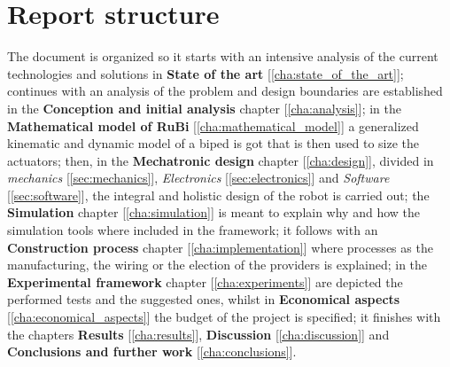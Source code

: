 \section{Report structure}
\label{sec:report_structure}
The document is organized so it starts with an intensive analysis of the current technologies and solutions in \textbf{State of the art} [\ref{cha:state_of_the_art}]; continues with an analysis of the problem and design boundaries are established in the \textbf{Conception and initial analysis} chapter [\ref{cha:analysis}]; in the \textbf{Mathematical model of RuBi} [\ref{cha:mathematical_model}] a generalized kinematic and dynamic model of a biped is got that is then used to size the actuators; then, in  the \textbf{Mechatronic design} chapter [\ref{cha:design}], divided in \textit{mechanics} [\ref{sec:mechanics}], \textit{Electronics} [\ref{sec:electronics}] and \textit{Software} [\ref{sec:software}], the integral and holistic design of the robot is carried out; the \textbf{Simulation} chapter [\ref{cha:simulation}] is meant to explain why and how the simulation tools where included in the framework; it follows with an \textbf{Construction process} chapter [\ref{cha:implementation}] where processes as the manufacturing, the wiring or the election of the providers is explained; in the \textbf{Experimental framework} chapter [\ref{cha:experiments}] are depicted the performed tests and the suggested ones, whilst in \textbf{Economical aspects} [\ref{cha:economical_aspects}] the budget of the project is specified; it finishes with the chapters \textbf{Results} [\ref{cha:results}], \textbf{Discussion} [\ref{cha:discussion}] and \textbf{Conclusions and further work} [\ref{cha:conclusions}].